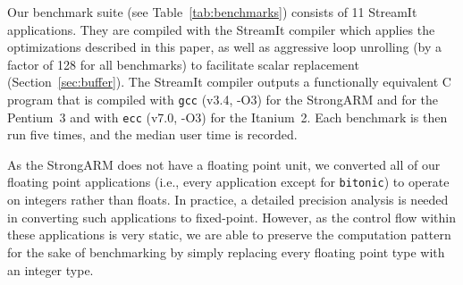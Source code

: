 \documentclass{sigplanconf}
\begin{document}
Our benchmark suite (see Table~\ref{tab:benchmarks}) consists of
11 StreamIt applications. They are compiled with the StreamIt
compiler which applies the optimizations described in this paper, as
well as aggressive loop unrolling (by a factor of 128 for all
benchmarks) to facilitate scalar replacement
(Section~\ref{sec:buffer}).  The StreamIt compiler outputs a
functionally equivalent C program that is compiled with \texttt{gcc}
(v3.4, -O3) for the StrongARM and for the Pentium~3 and with
\texttt{ecc} (v7.0, -O3) for the Itanium~2.  Each benchmark is then
run five times, and the median user time is recorded.

As the StrongARM does not have a floating point unit, we converted all
of our floating point applications (i.e., every application except for
{\tt bitonic}) to operate on integers rather than floats.  In
practice, a detailed precision analysis is needed in converting such
applications to fixed-point.  However, as the control flow within
these applications is very static, we are able to preserve the
computation pattern for the sake of benchmarking by simply replacing
every floating point type with an integer type.
\end{document}
